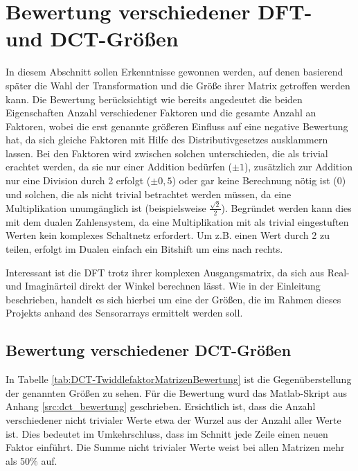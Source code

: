\section{Bewertung verschiedener DFT- und DCT-Größen}\label{sec:BewertungVerschiedenerGroessen}
In diesem Abschnitt sollen Erkenntnisse gewonnen werden, auf denen basierend später die Wahl der Transformation und die Größe ihrer Matrix getroffen werden kann.
Die Bewertung berücksichtigt wie bereits angedeutet die beiden Eigenschaften Anzahl verschiedener Faktoren und die gesamte Anzahl an Faktoren, wobei die erst genannte 
größeren Einfluss auf eine negative Bewertung hat, da sich gleiche Faktoren mit Hilfe des Distributivgesetzes ausklammern lassen.
Bei den Faktoren wird zwischen solchen unterschieden, die als trivial erachtet werden, da sie nur einer Addition bedürfen ($\pm1$), zusätzlich
zur Addition nur eine Division durch 2 erfolgt ($\pm0,5$) oder gar keine Berechnung nötig ist ($0$) und solchen, die als nicht trivial betrachtet werden müssen, da eine Multiplikation
unumgänglich ist (beispielsweise $\tfrac{\sqrt{2}}{2}$). Begründet werden kann dies mit dem dualen Zahlensystem, da eine Multiplikation mit als trivial eingestuften Werten kein
komplexes Schaltnetz erfordert. Um z.B. einen Wert durch 2 zu teilen, erfolgt im Dualen einfach ein Bitshift um eins nach rechts. 

Interessant ist die DFT trotz ihrer komplexen Ausgangsmatrix, da sich aus Real- und Imaginärteil direkt der Winkel berechnen lässt.
Wie in der Einleitung beschrieben, handelt es sich hierbei um eine der Größen, die im Rahmen dieses Projekts anhand des Sensorarrays ermittelt werden soll.



\subsection{Bewertung verschiedener DCT-Größen}
In Tabelle \ref{tab:DCT-TwiddlefaktorMatrizenBewertung} ist die Gegenüberstellung der genannten Größen zu sehen. Für die Bewertung wurd das 
Matlab-Skript aus Anhang \ref{src:dct_bewertung} geschrieben.
Ersichtlich ist, dass die Anzahl verschiedener nicht trivialer Werte etwa der Wurzel aus der Anzahl aller Werte ist.
Dies bedeutet im Umkehrschluss, dass im Schnitt jede Zeile einen neuen Faktor einführt. Die Summe nicht trivialer Werte weist bei allen Matrizen
mehr als 50$\%$ auf. 

